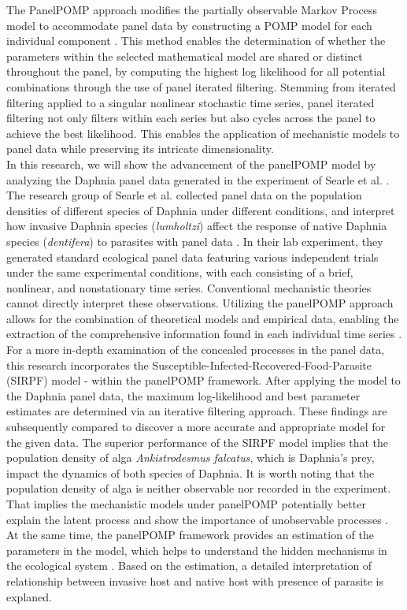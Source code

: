 \documentclass[12pt]{article}
\begin{document}
The PanelPOMP approach modifies the partially observable Markov Process model to accommodate panel data by constructing a POMP model for each individual component \cite{King2016}. This method enables the determination of whether the parameters within the selected mathematical model are shared or distinct throughout the panel, by computing the highest log likelihood for all potential combinations through the use of panel iterated filtering. Stemming from iterated filtering \cite{King2016} applied to a singular nonlinear stochastic time series, panel iterated filtering not only filters within each series but also cycles across the panel to achieve the best likelihood. This enables the application of mechanistic models to panel data while preserving its intricate dimensionality.\\

In this research, we will show the advancement of the panelPOMP model by analyzing the Daphnia panel data generated in the experiment of Searle et al. \cite{Searle2016}. The research group of Searle et al. collected panel data on the population densities of different species of Daphnia under different conditions, and interpret how invasive Daphnia species (\textit{lumholtzi}) affect the response of native Daphnia species (\textit{dentifera}) to parasites with panel data \cite{Searle2016}. In their lab experiment, they generated standard ecological panel data featuring various independent trials under the same experimental conditions, with each consisting of a brief, nonlinear, and nonstationary time series. Conventional mechanistic theories cannot directly interpret these observations. Utilizing the panelPOMP approach allows for the combination of theoretical models and empirical data, enabling the extraction of the comprehensive information found in each individual time series \cite{Carles2020}.\\

For a more in-depth examination of the concealed processes in the panel data, this research incorporates the Susceptible-Infected-Recovered-Food-Parasite (SIRPF) model - within the panelPOMP framework. After applying the model to the Daphnia panel data, the maximum log-likelihood and best parameter estimates are determined via an iterative filtering approach. These findings are subsequently compared to discover a more accurate and appropriate model for the given data. The superior performance of the SIRPF model implies that the population density of alga \textit{Ankistrodesmus falcatus}, which is Daphnia's prey, impact the dynamics of both species of Daphnia. It is worth noting that the population density of alga is neither observable nor recorded in the experiment. That implies the mechanistic models under panelPOMP potentially better explain the latent process and show the importance of unobservable processes \cite{Edwards2012}. At the same time, the panelPOMP framework provides an estimation of the parameters in the model, which helps to understand the hidden mechanisms in the ecological system \cite{Carles2020}. Based on the estimation, a detailed interpretation of relationship between invasive host and native host with presence of parasite is explaned.\\
\end{document}
